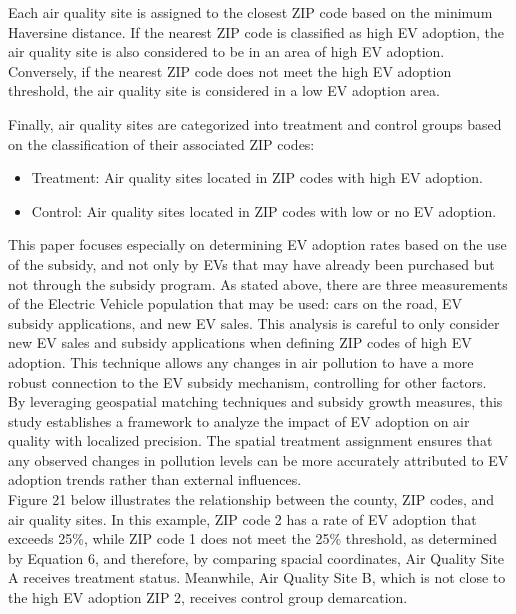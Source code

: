 \documentclass[12pt]{article}
\newcommand\tab[1][.50cm]{\hspace*{#1}}
\begin{document}
	\begin{multicols}{2}
		
		
		Each air quality site is assigned to the closest ZIP code based on the minimum Haversine distance. If the nearest ZIP code is classified as high EV adoption, the air quality site is also considered to be in an area of high EV adoption. Conversely, if the nearest ZIP code does not meet the high EV adoption threshold, the air quality site is considered in a low EV adoption area.
		
		Finally, air quality sites are categorized into treatment and control groups based on the classification of their associated ZIP codes:
		\begin{itemize}
			\item Treatment: Air quality sites located in ZIP codes with high EV adoption.
			\item Control: Air quality sites located in ZIP codes with low or no EV adoption.
		\end{itemize}
		
		This paper focuses especially on determining EV adoption rates based on the use of the subsidy, and not only by EVs that may have already been purchased but not through the subsidy program. As stated above, there are three measurements of the Electric Vehicle population that may be used: cars on the road, EV subsidy applications, and new EV sales. This analysis is careful to only consider new EV sales and subsidy applications when defining ZIP codes of high EV adoption. This technique allows any changes in air pollution to have a more robust connection to the EV subsidy mechanism, controlling for other factors.\\
		\tab By leveraging geospatial matching techniques and subsidy growth measures, this study establishes a framework to analyze the impact of EV adoption on air quality with localized precision. The spatial treatment assignment ensures that any observed changes in pollution levels can be more accurately attributed to EV adoption trends rather than external influences.\\
		\tab Figure 21 below illustrates the relationship between the county, ZIP codes, and air quality sites. In this example, ZIP code 2 has a rate of EV adoption that exceeds 25\%, while ZIP code 1 does not meet the 25\% threshold,  as determined by Equation 6, and therefore, by comparing spacial coordinates, Air Quality Site A receives treatment status. Meanwhile, Air Quality Site B, which is not close to the high EV adoption ZIP 2, receives control group demarcation.
		
	\end{multicols}
	\setcounter{figure}{20}
	
\end{document}
